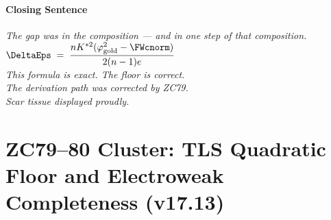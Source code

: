 \documentclass[12pt, a4paper]{article}
\begin{document}
\subsection{Closing Sentence}

\bigskip
\begin{center}
\textit{%
  The gap was in the composition --- and in one step of that composition.\\[0.4em]
  $\displaystyle
    \DeltaEps
    \;=\;
    \frac{nK^{*2}(\varphi_{\rm gold}^2 - \FWcnorm)}{2(n-1)e}
  $\\[0.5em]
  This formula is exact. The floor is correct.\\[0.3em]
  The derivation path was corrected by ZC79.\\
  Scar tissue displayed proudly.
}
\end{center}



\newpage
\part{ZC79--80 Cluster: TLS Quadratic Floor and Electroweak
  Completeness (v17.13)}
\label{part:L}
\end{document}
